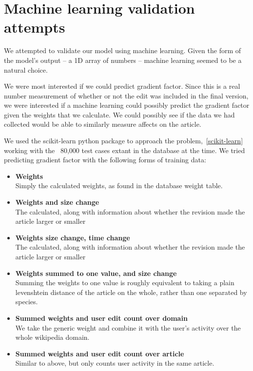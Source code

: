\section{Machine learning validation attempts}
\label{mlisbad}
We attempted to validate our model using machine learning. Given the
form of the model's output -- a 1D array of numbers -- machine
learning seemed to be a natural choice.

We were most interested if we could predict gradient factor. Since
this is a real number measurement of whether or not the edit was
included in the final version, we were interested if a machine
learning could possibly predict the gradient factor given the weights
that we calculate. We could possibly see if the data we had collected
would be able to similarly measure affects on the article.

We used the scikit-learn python package to approach the
problem,~\ref{scikit-learn} working with the ~80,000 test cases extant
in the database at the time. We tried predicting gradient factor with
the following forms of training data:

\begin{itemize}
  \item \textbf{Weights}\\
    Simply the calculated weights, as found in the database weight table. 

  \item \textbf{Weights and size change}\\
    The calculated, along with information about whether the revision
    made the article larger or smaller

  \item \textbf{Weights size change, time change}\\
    The calculated, along with information about whether the revision
    made the article larger or smaller

  \item \textbf{Weights summed to one value, and size change}\\
    Summing the weights to one value is roughly equivalent to taking a
    plain levenshtein distance of the article on the whole, rather
    than one separated by species.
    
  \item \textbf{Summed weights and user edit count over
    domain}\\ We take the generic weight and combine it with the
    user's activity over the whole wikipedia domain.
    

  \item \textbf{Summed weights and user edit count over
    article}\\ Similar to above, but only counts user activity in the
    same article.

\end{itemize}

